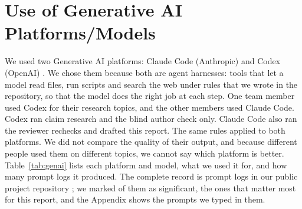 \section{Use of Generative AI Platforms/Models}\label{sec:genai}

We used two Generative AI platforms: Claude Code (Anthropic) \cite{genai-claude-code-claude-opus-5-5,genai-claude-code-claude-opus-5-5-and-claude-sonnet-5-5,genai-claude-code-claude-sonnet-5-5} and Codex (OpenAI) \cite{genai-codex-gpt-6-1-sol}. We chose them because both are agent harnesses: tools that let a model read files, run scripts and search the web under rules that we wrote in the repository, so that the model does the right job at each step. One team member used Codex for their research topics, and the other members used Claude Code. Codex ran claim research and the blind author check only. Claude Code also ran the reviewer rechecks and drafted this report. The same rules applied to both platforms. We did not compare the quality of their output, and because different people used them on different topics, we cannot say which platform is better. Table~\ref{tab:genai} lists each platform and model, what we used it for, and how many prompt logs it produced. The complete record is \logsTotal{} prompt logs in our public project repository \cite{repo}; we marked \logsSignificant{} of them as significant, the ones that matter most for this report, and the Appendix shows the prompts we typed in them.

\begin{table}[ht]
\centering
\caption{GenAI platforms and models used in 2026, from the prompt logs.}
\label{tab:genai}

\end{table}


